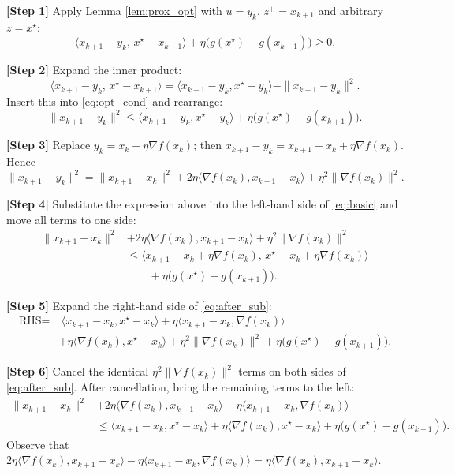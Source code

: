 \documentclass{article}
\newcommand{\grad}{\nabla}
\begin{document}
\noindent\textbf{[Step 1]} Apply Lemma \ref{lem:prox_opt} with $u=y_{k}$, $z^{+}=x_{k+1}$ and arbitrary $z=x^{\star}$:
\begin{equation}
\label{eq:opt_cond}
\langle x_{k+1}-y_{k},\,x^{\star}-x_{k+1}\rangle+\eta\bigl(g(x^{\star})-g(x_{k+1})\bigr)\ge 0.
\end{equation}

\noindent\textbf{[Step 2]} Expand the inner product:
\[
\langle x_{k+1}-y_{k},\,x^{\star}-x_{k+1}\rangle
= \langle x_{k+1}-y_{k},x^{\star}-y_{k}\rangle-\|x_{k+1}-y_{k}\|^{2}.
\]
Insert this into \eqref{eq:opt_cond} and rearrange:
\begin{equation}
\label{eq:basic}
\|x_{k+1}-y_{k}\|^{2}\le \langle x_{k+1}-y_{k},x^{\star}-y_{k}\rangle+\eta\bigl(g(x^{\star})-g(x_{k+1})\bigr).
\end{equation}

\noindent\textbf{[Step 3]} Replace $y_{k}=x_{k}-\eta\grad f(x_{k})$; then $x_{k+1}-y_{k}=x_{k+1}-x_{k}+ \eta\grad f(x_{k})$. Hence
\[
\|x_{k+1}-y_{k}\|^{2}= \|x_{k+1}-x_{k}\|^{2}+2\eta\langle\grad f(x_{k}),x_{k+1}-x_{k}\rangle+\eta^{2}\|\grad f(x_{k})\|^{2}.
\]

\noindent\textbf{[Step 4]} Substitute the expression above into the left‑hand side of \eqref{eq:basic} and move all terms to one side:
\begin{align}
\|x_{k+1}-x_{k}\|^{2}&+2\eta\langle\grad f(x_{k}),x_{k+1}-x_{k}\rangle+\eta^{2}\|\grad f(x_{k})\|^{2} \nonumber\\
&\le \langle x_{k+1}-x_{k}+\eta\grad f(x_{k}),\,x^{\star}-x_{k}+\eta\grad f(x_{k})\rangle \nonumber\\
&\qquad +\eta\bigl(g(x^{\star})-g(x_{k+1})\bigr). \label{eq:after_sub}
\end{align}

\noindent\textbf{[Step 5]} Expand the right‑hand side of \eqref{eq:after_sub}:
\begin{align}
\text{RHS}= &\ \langle x_{k+1}-x_{k},x^{\star}-x_{k}\rangle
+\eta\langle x_{k+1}-x_{k},\grad f(x_{k})\rangle \nonumber\\
&+\eta\langle \grad f(x_{k}),x^{\star}-x_{k}\rangle
+\eta^{2}\|\grad f(x_{k})\|^{2}
+\eta\bigl(g(x^{\star})-g(x_{k+1})\bigr). \label{eq:rhs_expand}
\end{align}

\noindent\textbf{[Step 6]} Cancel the identical $\eta^{2}\|\grad f(x_{k})\|^{2}$ terms on both sides of \eqref{eq:after_sub}. After cancellation, bring the remaining terms to the left:
\begin{align}
\|x_{k+1}-x_{k}\|^{2}
&+2\eta\langle\grad f(x_{k}),x_{k+1}-x_{k}\rangle
-\eta\langle x_{k+1}-x_{k},\grad f(x_{k})\rangle \nonumber\\
&\le \langle x_{k+1}-x_{k},x^{\star}-x_{k}\rangle
+\eta\langle \grad f(x_{k}),x^{\star}-x_{k}\rangle
+\eta\bigl(g(x^{\star})-g(x_{k+1})\bigr). \label{eq:mid}
\end{align}
Observe that $2\eta\langle\grad f(x_{k}),x_{k+1}-x_{k}\rangle-\eta\langle x_{k+1}-x_{k},\grad f(x_{k})\rangle = \eta\langle\grad f(x_{k}),x_{k+1}-x_{k}\rangle$.
\end{document}
